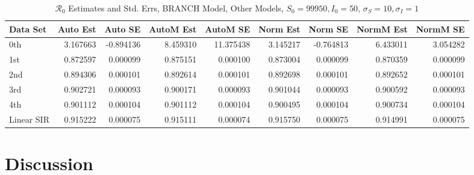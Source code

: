 \documentclass[12pt]{article}
\newcommand{\rr}{\ensuremath{\mathcal{R}_0}}
\begin{document}
\begin{table}[H]
	
	\caption{$\rr$ Estimates and Std. Errs, BRANCH Model,
		Other Models, $S_0 = 99950, I_0 = 50$, 
		$\sigma_S = 10, \sigma_I = 1$}
	\begin{footnotesize}
		\hskip -1cm
	\begin{tabular}{l|r|r|r|r|r|r|r|r}
		\hline
		Data Set & Auto Est & Auto SE & AutoM Est & AutoM SE & Norm Est & Norm SE & NormM Est & NormM SE\\
		\hline
		0th & 3.167663 & -0.894136 & 8.459310 & 11.375438 & 3.145217 & -0.764813 & 6.433011 & 3.054282\\
		\hline
		1st & 0.872597 & 0.000099 & 0.875151 & 0.000100 & 0.873004 & 0.000099 & 0.870359 & 0.000099\\
		\hline
		2nd & 0.894306 & 0.000101 & 0.892614 & 0.000101 & 0.892698 & 0.000101 & 0.892652 & 0.000101\\
		\hline
		3rd & 0.902721 & 0.000093 & 0.900171 & 0.000093 & 0.901044 & 0.000093 & 0.900592 & 0.000093\\
		\hline
		4th & 0.901112 & 0.000104 & 0.901112 & 0.000104 & 0.900495 & 0.000104 & 0.900734 & 0.000104\\
		\hline
		Linear SIR & 0.915222 & 0.000075 & 0.915111 & 0.000074 & 0.915750 & 0.000075 & 0.914991 & 0.000075\\
		\hline
	\end{tabular}
\end{footnotesize}
\end{table}

\section{Discussion}
\label{sec:dis}








\end{document}
